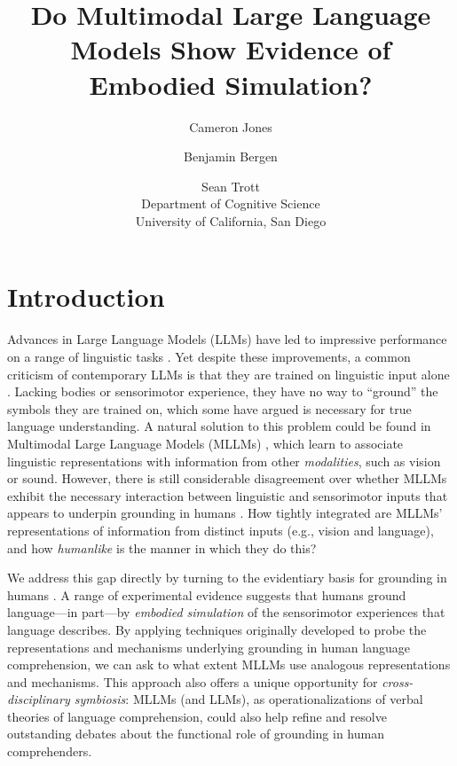 \documentclass[11pt]{article}
\title{Do Multimodal Large Language Models Show Evidence of Embodied Simulation?}
\author{Cameron Jones \and Benjamin Bergen \and Sean Trott \\
         Department of Cognitive Science\\ University of California, San Diego}
\begin{document}
\maketitle
\begin{abstract}

\end{abstract}

\section{Introduction}

Advances in Large Language Models (LLMs) have led to impressive performance on a range of linguistic tasks \cite{hu2022fine, trott2023large, dillion2023can}. Yet despite these improvements, a common criticism of contemporary LLMs is that they are trained on linguistic input alone \cite{bender2020climbing, bisk2020experience}. Lacking bodies or sensorimotor experience, they have no way to ``ground'' the symbols they are trained on, which some \cite{harnad1990symbol} have argued is necessary for true language understanding. A natural solution to this problem could be found in Multimodal Large Language Models (MLLMs) \cite{driess2023palm, girdhar2023imagebind, huang2023language, radfordLearningTransferableVisual2021a}, which learn to associate linguistic representations with information from other \textit{modalities}, such as vision or sound. However, there is still considerable disagreement over whether MLLMs exhibit the necessary interaction between linguistic and sensorimotor inputs that appears to underpin grounding in humans \cite{mollo2023vector}. How tightly integrated are MLLMs' representations of  information from distinct inputs (e.g., vision and language), and how \textit{humanlike} is the manner in which they do this?

We address this gap directly by turning to the evidentiary basis for grounding in humans \cite{bergen2015embodiment}. A range of experimental evidence suggests that humans ground language---in part---by \textit{embodied simulation} of the sensorimotor experiences that language describes.
By applying techniques originally developed to probe the representations and mechanisms underlying grounding in human language comprehension, we can ask to what extent MLLMs use analogous representations and mechanisms. This approach also offers a unique opportunity for \textit{cross-disciplinary symbiosis}: MLLMs (and LLMs), as operationalizations of verbal theories of language comprehension, could also help refine and resolve outstanding debates about the functional role of grounding in human comprehenders.
\end{document}

